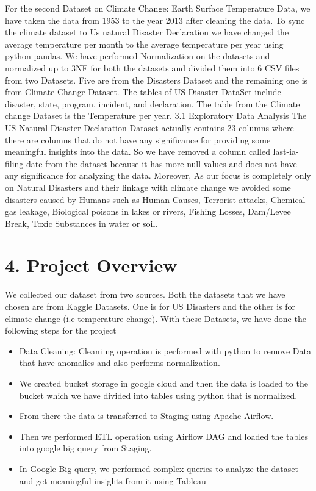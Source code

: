 \documentclass[10pt,twocolumn,letterpaper]{article}
\begin{document}
For the second Dataset on Climate Change: Earth Surface Temperature Data, we have taken the data from 1953  to the year 2013 after cleaning the data. To sync the climate dataset to Us natural Disaster Declaration we have changed the average temperature per month to the average temperature per year using python pandas.
We have performed Normalization on the datasets and normalized up to 3NF for both the datasets and divided them into 6 CSV files from two Datasets. Five are from the Disasters Dataset and the remaining one is from Climate Change Dataset. The tables of US Disaster DataSet include disaster, state, program, incident, and declaration. The table from the Climate change Dataset is the Temperature per year.
{3.1 Exploratory Data Analysis}
The US Natural Disaster Declaration Dataset actually contains 23 columns where there are columns that do not have any significance for providing some meaningful insights into the data. So we have removed a column called last-ia-filing-date from the dataset because it has more null values and does not have any significance for analyzing the data.
Moreover,  As our focus is completely only on Natural Disasters and their linkage with climate change we avoided some disasters caused by Humans such as Human Causes, Terrorist attacks, Chemical gas leakage, Biological poisons in lakes or rivers, Fishing Losses, Dam/Levee Break, Toxic Substances in water or soil.
\section{4. Project Overview}
We collected our dataset from two sources. Both the datasets that we have chosen are from Kaggle Datasets. One is for US Disasters and the other is for climate change (i.e temperature change). With these Datasets, we have done the following steps for the project
\begin{itemize}
	\item   Data Cleaning: Cleani ng operation is performed with python to remove Data that have anomalies and also performs normalization.
	\item    We created bucket storage in google cloud and then the data is loaded to the bucket which we have divided into tables using python that is normalized.
	\item  From there the data is transferred to Staging using Apache  Airflow.
        \item Then we performed ETL operation using Airflow DAG and loaded the tables into google big query from Staging.
        \item In Google Big query, we performed complex queries to analyze the dataset and get meaningful insights from it using Tableau
\end{itemize}   
\end{document}
